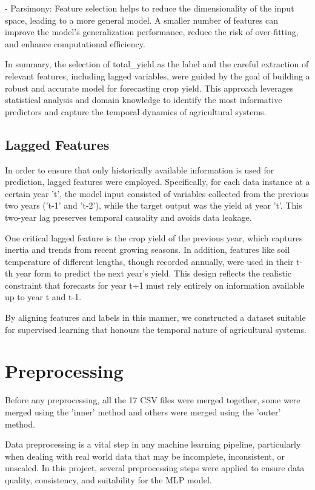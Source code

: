\documentclass[a4paper, 12pt]{article}
\begin{document}
- Parsimony: Feature selection helps to reduce the dimensionality of the input space, leading to a more general model. A smaller number of features can improve the model's generalization performance, reduce the risk of over-fitting, and enhance computational efficiency.

In summary, the selection of total\_yield as the label and the careful extraction of relevant features, including lagged variables, were guided by the goal of building a robust and accurate model for forecasting crop yield. This approach leverages statistical analysis and domain knowledge to identify the most informative predictors and capture the temporal dynamics of agricultural systems.

\subsection{Lagged Features}
In order to ensure that only historically available information is used for prediction, lagged features were employed. Specifically, for each data instance at a certain year 't', the model input consisted of variables collected from the previous two years ('t-1' and 't-2'), while the target output was the yield at year 't'. This two-year lag preserves temporal causality and avoids data leakage.

One critical lagged feature is the crop yield of the previous year, which captures inertia and trends from recent growing seasons. In addition, features like soil temperature of different lengths, though recorded annually, were used in their t-th year form to predict the next year’s yield. This design reflects the realistic constraint that forecasts for year t+1 must rely entirely on information available up to year t and t-1.

By aligning features and labels in this manner, we constructed a dataset suitable for supervised learning that honours the temporal nature of agricultural systems.

\section{Preprocessing}
Before any preprocessing, all the 17 CSV files were merged together, some were merged using the 'inner' method and others were merged using the 'outer' method.

Data preprocessing is a vital step in any machine learning pipeline, particularly when dealing with real world data that may be incomplete, inconsistent, or unscaled. In this project, several preprocessing steps were applied to ensure data quality, consistency, and suitability for the MLP model.
\end{document}
